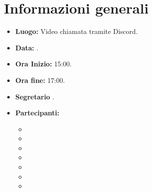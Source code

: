 \documentclass[12pt]{article}
\begin{document}
	
	
	
	
	
	\newpage
	\tableofcontents
	\newpage
	
	\section{Informazioni generali}
	\begin{itemize}
		\item \textbf{Luogo:} Video chiamata tramite Discord.
		\item \textbf{Data:} \datared.
		\item \textbf{Ora Inizio:} 15:00.
		\item \textbf{Ora fine:} 17:00.
		\item \textbf{Segretario} \SB.
		\item \textbf{Partecipanti:}
		\begin{itemize}
			\item \MB
			\item \VAS
			\item \FD
			\item \NM
			\item \SB
			\item \GB
			\item \MDI
		\end{itemize}	
	\end{itemize}
	
	
	\newpage
	
	
	
\newpage	
	
	
\end{document}
